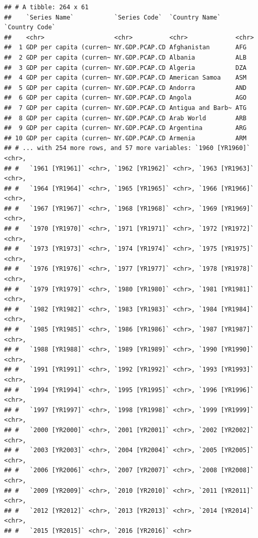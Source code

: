\documentclass[11pt,]{article}
\begin{document}
\begin{verbatim}
## # A tibble: 264 x 61
##    `Series Name`           `Series Code`  `Country Name`    `Country Code`
##    <chr>                   <chr>          <chr>             <chr>         
##  1 GDP per capita (curren~ NY.GDP.PCAP.CD Afghanistan       AFG           
##  2 GDP per capita (curren~ NY.GDP.PCAP.CD Albania           ALB           
##  3 GDP per capita (curren~ NY.GDP.PCAP.CD Algeria           DZA           
##  4 GDP per capita (curren~ NY.GDP.PCAP.CD American Samoa    ASM           
##  5 GDP per capita (curren~ NY.GDP.PCAP.CD Andorra           AND           
##  6 GDP per capita (curren~ NY.GDP.PCAP.CD Angola            AGO           
##  7 GDP per capita (curren~ NY.GDP.PCAP.CD Antigua and Barb~ ATG           
##  8 GDP per capita (curren~ NY.GDP.PCAP.CD Arab World        ARB           
##  9 GDP per capita (curren~ NY.GDP.PCAP.CD Argentina         ARG           
## 10 GDP per capita (curren~ NY.GDP.PCAP.CD Armenia           ARM           
## # ... with 254 more rows, and 57 more variables: `1960 [YR1960]` <chr>,
## #   `1961 [YR1961]` <chr>, `1962 [YR1962]` <chr>, `1963 [YR1963]` <chr>,
## #   `1964 [YR1964]` <chr>, `1965 [YR1965]` <chr>, `1966 [YR1966]` <chr>,
## #   `1967 [YR1967]` <chr>, `1968 [YR1968]` <chr>, `1969 [YR1969]` <chr>,
## #   `1970 [YR1970]` <chr>, `1971 [YR1971]` <chr>, `1972 [YR1972]` <chr>,
## #   `1973 [YR1973]` <chr>, `1974 [YR1974]` <chr>, `1975 [YR1975]` <chr>,
## #   `1976 [YR1976]` <chr>, `1977 [YR1977]` <chr>, `1978 [YR1978]` <chr>,
## #   `1979 [YR1979]` <chr>, `1980 [YR1980]` <chr>, `1981 [YR1981]` <chr>,
## #   `1982 [YR1982]` <chr>, `1983 [YR1983]` <chr>, `1984 [YR1984]` <chr>,
## #   `1985 [YR1985]` <chr>, `1986 [YR1986]` <chr>, `1987 [YR1987]` <chr>,
## #   `1988 [YR1988]` <chr>, `1989 [YR1989]` <chr>, `1990 [YR1990]` <chr>,
## #   `1991 [YR1991]` <chr>, `1992 [YR1992]` <chr>, `1993 [YR1993]` <chr>,
## #   `1994 [YR1994]` <chr>, `1995 [YR1995]` <chr>, `1996 [YR1996]` <chr>,
## #   `1997 [YR1997]` <chr>, `1998 [YR1998]` <chr>, `1999 [YR1999]` <chr>,
## #   `2000 [YR2000]` <chr>, `2001 [YR2001]` <chr>, `2002 [YR2002]` <chr>,
## #   `2003 [YR2003]` <chr>, `2004 [YR2004]` <chr>, `2005 [YR2005]` <chr>,
## #   `2006 [YR2006]` <chr>, `2007 [YR2007]` <chr>, `2008 [YR2008]` <chr>,
## #   `2009 [YR2009]` <chr>, `2010 [YR2010]` <chr>, `2011 [YR2011]` <chr>,
## #   `2012 [YR2012]` <chr>, `2013 [YR2013]` <chr>, `2014 [YR2014]` <chr>,
## #   `2015 [YR2015]` <chr>, `2016 [YR2016]` <chr>
\end{verbatim}
\end{document}

